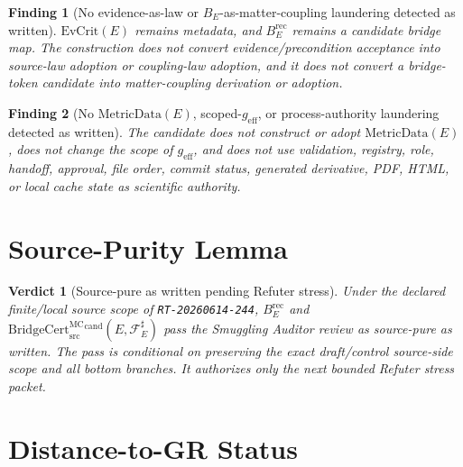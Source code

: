 \documentclass[11pt]{article}
\newcommand{\geff}{g_{\mathrm{eff}}}
\newcommand{\MetricData}{\mathrm{MetricData}}
\newcommand{\BridgeCert}{\mathrm{BridgeCert}_{\mathrm{src}}^{\mathrm{MC}}}
\newcommand{\EvCrit}{\mathrm{EvCrit}}
\newcommand{\BErec}{B_E^{\mathrm{rec}}}
\newtheorem{finding}{Finding}
\newtheorem{verdict}{Verdict}
\begin{document}
\begin{finding}[No evidence-as-law or \(B_E\)-as-matter-coupling laundering detected as written]
\(\EvCrit(E)\) remains metadata, and \(\BErec\) remains a candidate bridge map.
The construction does not convert evidence/precondition acceptance into
source-law adoption or coupling-law adoption, and it does not convert a
bridge-token candidate into matter-coupling derivation or adoption.
\end{finding}

\begin{finding}[No \(\MetricData(E)\), scoped-\(\geff\), or process-authority laundering detected as written]
The candidate does not construct or adopt \(\MetricData(E)\), does not change
the scope of \(\geff\), and does not use validation, registry, role, handoff,
approval, file order, commit status, generated derivative, PDF, HTML, or local
cache state as scientific authority.
\end{finding}

\section{Source-Purity Lemma}

\begin{verdict}[Source-pure as written pending Refuter stress]
Under the declared finite/local source scope of \texttt{RT-20260614-244},
\(\BErec\) and \(\BridgeCert^{\mathrm{cand}}(E,\mathcal{F}_E^\sharp)\) pass
the Smuggling Auditor review as source-pure as written. The pass is conditional
on preserving the exact draft/control source-side scope and all bottom
branches. It authorizes only the next bounded Refuter stress packet.
\end{verdict}

\section{Distance-to-GR Status}
\end{document}
